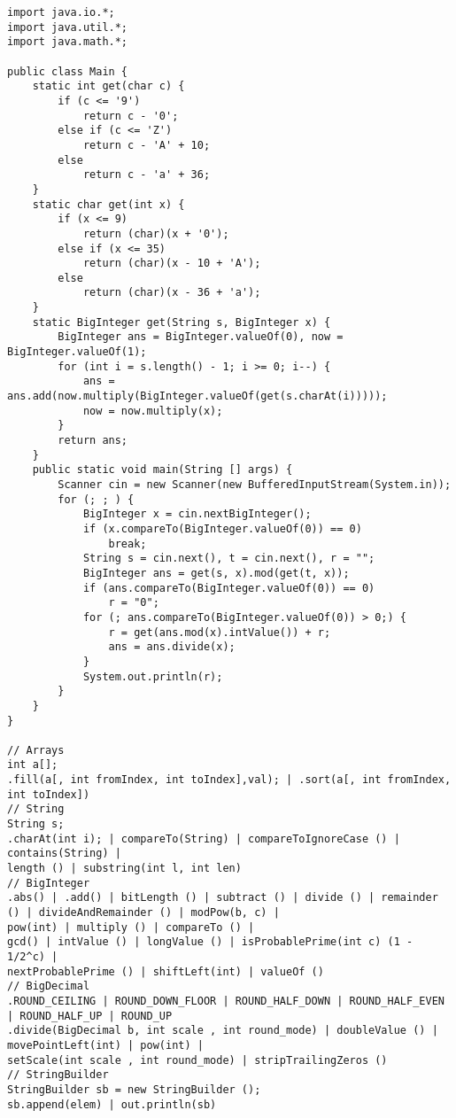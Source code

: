 \lstset{
	language=JAVA,
	tabsize=4,
	numbers=left,
	breaklines=tr,
	extendedchars=false
	xleftmargin=0em,
	xrightmargin=0em,
	aboveskip=1em,
	numberstyle=\small\Courier,
    basicstyle=\small\Courier
}
\begin{lstlisting}
import java.io.*;
import java.util.*;
import java.math.*;

public class Main {
	static int get(char c) {
		if (c <= '9')
			return c - '0';
		else if (c <= 'Z')
			return c - 'A' + 10;
		else
			return c - 'a' + 36;
	}
	static char get(int x) {
		if (x <= 9)
			return (char)(x + '0');
		else if (x <= 35)
			return (char)(x - 10 + 'A');
		else
			return (char)(x - 36 + 'a');
	}
	static BigInteger get(String s, BigInteger x) {
		BigInteger ans = BigInteger.valueOf(0), now = BigInteger.valueOf(1);
		for (int i = s.length() - 1; i >= 0; i--) {
			ans = ans.add(now.multiply(BigInteger.valueOf(get(s.charAt(i)))));
			now = now.multiply(x);
		}
		return ans;
	}
	public static void main(String [] args) {
		Scanner cin = new Scanner(new BufferedInputStream(System.in));
		for (; ; ) {
			BigInteger x = cin.nextBigInteger();
			if (x.compareTo(BigInteger.valueOf(0)) == 0)
				break;
			String s = cin.next(), t = cin.next(), r = "";
			BigInteger ans = get(s, x).mod(get(t, x));
			if (ans.compareTo(BigInteger.valueOf(0)) == 0)
				r = "0";
			for (; ans.compareTo(BigInteger.valueOf(0)) > 0;) {
				r = get(ans.mod(x).intValue()) + r;
				ans = ans.divide(x);
			}
			System.out.println(r);
		}
	}
}

// Arrays
int a[];
.fill(a[, int fromIndex, int toIndex],val); | .sort(a[, int fromIndex, int toIndex])
// String
String s;
.charAt(int i); | compareTo(String) | compareToIgnoreCase () | contains(String) |
length () | substring(int l, int len)
// BigInteger
.abs() | .add() | bitLength () | subtract () | divide () | remainder () | divideAndRemainder () | modPow(b, c) |
pow(int) | multiply () | compareTo () |
gcd() | intValue () | longValue () | isProbablePrime(int c) (1 - 1/2^c) |
nextProbablePrime () | shiftLeft(int) | valueOf ()
// BigDecimal
.ROUND_CEILING | ROUND_DOWN_FLOOR | ROUND_HALF_DOWN | ROUND_HALF_EVEN | ROUND_HALF_UP | ROUND_UP
.divide(BigDecimal b, int scale , int round_mode) | doubleValue () | movePointLeft(int) | pow(int) |
setScale(int scale , int round_mode) | stripTrailingZeros ()
// StringBuilder
StringBuilder sb = new StringBuilder ();
sb.append(elem) | out.println(sb)
\end{lstlisting}
